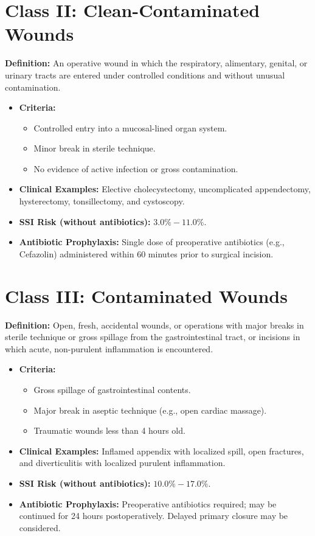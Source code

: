 \section*{Class II: Clean-Contaminated Wounds}
\textbf{Definition:} An operative wound in which the respiratory, alimentary, genital, or urinary tracts are entered under controlled conditions and without unusual contamination.
\begin{itemize}
  \item \textbf{Criteria:}
  \begin{itemize}
    \item Controlled entry into a mucosal-lined organ system.
    \item Minor break in sterile technique.
    \item No evidence of active infection or gross contamination.
  \end{itemize}
  \item \textbf{Clinical Examples:} Elective cholecystectomy, uncomplicated appendectomy, hysterectomy, tonsillectomy, and cystoscopy.
  \item \textbf{SSI Risk (without antibiotics):} $3.0\% - 11.0\%$.
  \item \textbf{Antibiotic Prophylaxis:} Single dose of preoperative antibiotics (e.g., Cefazolin) administered within 60 minutes prior to surgical incision.
\end{itemize}

\section*{Class III: Contaminated Wounds}
\textbf{Definition:} Open, fresh, accidental wounds, or operations with major breaks in sterile technique or gross spillage from the gastrointestinal tract, or incisions in which acute, non-purulent inflammation is encountered.
\begin{itemize}
  \item \textbf{Criteria:}
  \begin{itemize}
    \item Gross spillage of gastrointestinal contents.
    \item Major break in aseptic technique (e.g., open cardiac massage).
    \item Traumatic wounds less than 4 hours old.
  \end{itemize}
  \item \textbf{Clinical Examples:} Inflamed appendix with localized spill, open fractures, and diverticulitis with localized purulent inflammation.
  \item \textbf{SSI Risk (without antibiotics):} $10.0\% - 17.0\%$.
  \item \textbf{Antibiotic Prophylaxis:} Preoperative antibiotics required; may be continued for 24 hours postoperatively. Delayed primary closure may be considered.
\end{itemize}

